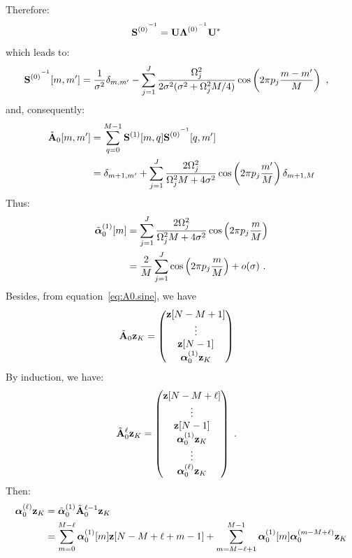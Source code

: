 \documentclass[journal,onecolumn]{IEEEtran}
\begin{document}
Therefore:
\begin{align*}
{{\mathbf S}^{(0)}}^{^{-1}}  &= {\mathbf U}{\boldsymbol{\Lambda}^{(0)}}^{^{-1}}{\mathbf U}^*
\end{align*}
which leads to:
\begin{align*}
{{\mathbf S}^{(0)}}^{^{-1}}[m,m']  &= \dfrac1{\sigma^2}\delta_{m,m'}-\sum_{j=1}^J\dfrac{\Omega_j^2}{2\sigma^2(\sigma^2+\Omega_j^2M/4)}\cos\left(2\pi p_j \dfrac{m-m'}{M}\right)\ ,
\end{align*}
and, consequently:
\begin{align}
\nonumber
\tilde\bA_0[m,m']  &= \sum_{q=0}^{M-1} {\bS^{(1)}}[m,q]{\bS^{(0)}}^\inv[q,m'] \\
&= \delta_{m+1,m'} + \sum_{j=1}^J\dfrac{2\Omega_j^2}{\Omega_j^2M+4\sigma^2}\cos\left(2\pi p_j\frac{m'}{M}\right)\delta_{m+1,M}
\label{eq:A0.sine}
\end{align}
Thus:
\begin{align*}
\tilde{\boldsymbol{\alpha}}_0^{(1)}[m]  &=\sum_{j=1}^J\dfrac{2\Omega_j^2}{\Omega_j^2M+4\sigma^2}\cos\left(2\pi p_j\frac{m}{M}\right) \\
&= \dfrac{2}{M}\sum_{j=1}^J\cos\left(2\pi p_j\frac{m}{M}\right) + o(\sigma)\ .
\end{align*}
Besides, from equation~\eqref{eq:A0.sine}, we have
\begin{align*}
\tilde{{\mathbf A}}_0{\mathbf z}_{K} &= 
\begin{pmatrix}
{\mathbf z}[N-M+1] \\
\vdots \\
{\mathbf z}[N-1] \\
\boldsymbol{\alpha}_0^{(1)}{\mathbf z}_K
\end{pmatrix}
\end{align*}
By induction, we have:
\begin{align*}
\tilde{{\mathbf A}}_0^{\ell}{\mathbf z}_{K} &= 
\begin{pmatrix}
{\mathbf z}[N-M+\ell] \\
\vdots \\
{\mathbf z}[N-1] \\
\boldsymbol{\alpha}_0^{(1)}{\mathbf z}_K \\
\vdots \\
\boldsymbol{\alpha}_0^{(\ell)}{\mathbf z}_K
\end{pmatrix}
\ .
\end{align*}
Then:
\begin{align}
\nonumber
\balpha_0^{(\ell)}\bz_{K} &= \tilde\balpha_0^{(1)}\tilde\bA_0^{\ell-1}\bz_{K} \\
&=\sum_{m=0}^{M-\ell}\balpha_0^{(1)}[m]\bz[N-M+\ell+m-1]+\sum_{m=M-\ell+1}^{M-1}\balpha_0^{(1)}[m]\balpha_0^{(m-M+\ell)}\bz_K
\label{eq:seq}
\end{align}
\end{document}
